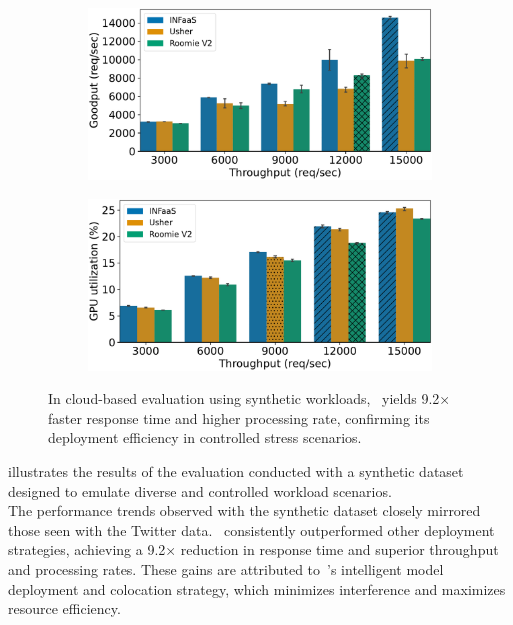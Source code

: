\begin{figure}[h!]
	\begin{subfigure}[b]{0.45\textwidth}
		\centering
		\includegraphics[width=\textwidth]{chapters/roomie/images/NvidiaA100/synthetic-all-models/goodput.pdf}
	\end{subfigure}
	\hfill
	\begin{subfigure}[b]{0.45\textwidth}
		\centering
		\includegraphics[width=\textwidth]{chapters/roomie/images/NvidiaA100/synthetic-all-models/gpu_utilization.pdf}
	\end{subfigure}
	\caption{In cloud-based evaluation using synthetic workloads,~\roomie{} yields 9.2× faster response time and higher processing rate, confirming its deployment efficiency in controlled stress scenarios.}
	\label{fig:NvidiaA100/synthetic-all-models}
	\vspace{-3mm}
\end{figure}


 illustrates the results of the evaluation conducted with a synthetic dataset designed to emulate diverse and controlled workload scenarios.\\
The performance trends observed with the synthetic dataset closely mirrored those seen with the Twitter data.~\roomie{} consistently outperformed other deployment strategies, achieving a 9.2× reduction in response time and superior throughput and processing rates. These gains are attributed to~\roomie's intelligent model deployment and colocation strategy, which minimizes interference and maximizes resource efficiency.


